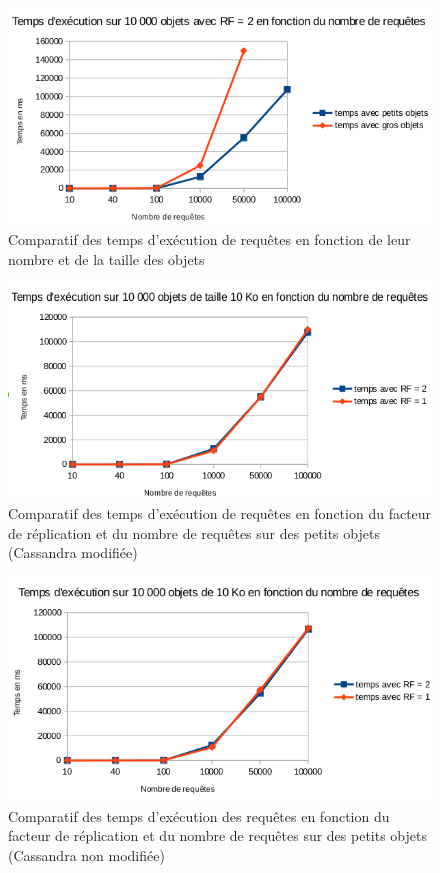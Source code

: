 \documentclass[12pt]{article}
\begin{document}

\begin{figure}[p]
	\centering
		\includegraphics[width=15cm]{images/tests/PAF-TailleO-RF2.png}
	\caption{Comparatif des temps d'exécution de requêtes en fonction de leur nombre et de la taille des objets \label{fig:test_taille_RF2}}
\end{figure}

\begin{figure}[p]
	\centering
        \includegraphics[width=15cm]{images/tests/PAF-RF-PO.png}
	\caption{Comparatif des temps d'exécution de requêtes en fonction du facteur de réplication et du nombre de requêtes sur des petits objets (Cassandra modifiée) \label{fig:test_RF_PO}}
\end{figure}

\begin{figure}[p]
	\centering
		\includegraphics[width=15cm]{images/tests/cassandra_non_modif-RF-PO.png}
	\caption{Comparatif des temps d'exécution des requêtes en fonction du facteur de réplication et du nombre de requêtes sur des petits objets (Cassandra non modifiée) \label{fig:test_cassandra_non_modif_RF_PO}}
\end{figure}
\end{document}
